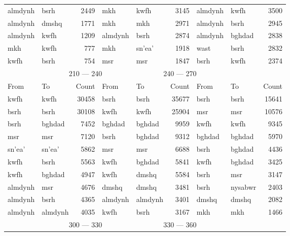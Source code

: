 \documentclass[12pt,english]{article}
\begin{document}
\begin{table}[H]
{\begin{tabular}{ |p{1.6cm}|p{1.6cm}|r||p{1.6cm}|p{1.6cm}|r||p{1.6cm}|p{1.6cm}|r|}
almdynh & bsrh & 2449 & mkh & kwfh & 3145 & almdynh & kwfh & 3500 \\ 
almdynh & dmshq & 1771 & mkh & mkh & 2971 & almdynh & bsrh & 2945 \\ 
almdynh & kwfh & 1209 & almdynh & bsrh & 2874 & almdynh & bghdad & 2838 \\ 
mkh & kwfh & 777 & mkh & sn'ea' & 1918 & wast & bsrh & 2832 \\ 
kwfh & bsrh & 754 & msr & msr & 1847 & bsrh & kwfh & 2374 \\ 
  \hhline{===::===::===}
         \multicolumn{3}{|c||}{\rule{0pt}{.4cm} 180 --- 210} &  \multicolumn{3}{c||}{\rule{0pt}{.4cm} 210 --- 240} &
         \multicolumn{3}{c|}{\rule{0pt}{.4cm} 240 --- 270}  \\ 
 \hhline{---||---||---}
 From & To    & Count &  From & To  & Count &  From & To  & Count\\
 \hhline{---||---||---}
kwfh & kwfh & 30458 & bsrh & bsrh & 35677 & bsrh & bsrh & 15641 \\ 
bsrh & bsrh & 30108 & kwfh & kwfh & 25904 & msr & msr & 10576 \\ 
bsrh & bghdad & 7452 & bghdad & bghdad & 9959 & kwfh & kwfh & 9345 \\ 
msr & msr & 7120 & bsrh & bghdad & 9312 & bghdad & bghdad & 5970 \\ 
sn'ea' & sn'ea' & 5862 & msr & msr & 6688 & bsrh & bghdad & 4436 \\ 
kwfh & bsrh & 5563 & kwfh & bghdad & 5841 & kwfh & bghdad & 3425 \\ 
kwfh & bghdad & 4947 & kwfh & dmshq & 5584 & bsrh & msr & 3147 \\ 
almdynh & msr & 4676 & dmshq & dmshq & 3481 & bsrh & nysabwr & 2403 \\ 
almdynh & bsrh & 4365 & almdynh & almdynh & 3401 & dmshq & dmshq & 2082 \\ 
almdynh & almdynh & 4035 & kwfh & bsrh & 3167 & mkh & mkh & 1466 \\ 
  \hhline{===::===::===}
         \multicolumn{3}{|c||}{\rule{0pt}{.4cm} 270 --- 300} &  \multicolumn{3}{c||}{\rule{0pt}{.4cm} 300 --- 330} &
         \multicolumn{3}{c|}{\rule{0pt}{.4cm} 330 --- 360}  \\ 
         

\end{tabular}}
\end{table}
\end{document}
